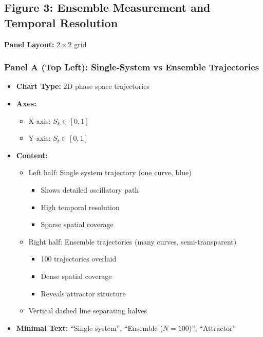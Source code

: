 
\subsection*{Figure 3: Ensemble Measurement and Temporal Resolution}

\textbf{Panel Layout:} $2 \times 2$ grid

\subsubsection*{Panel A (Top Left): Single-System vs Ensemble Trajectories}
\begin{itemize}
\item \textbf{Chart Type:} 2D phase space trajectories
\item \textbf{Axes:}
  \begin{itemize}
  \item X-axis: $S_k \in [0,1]$
  \item Y-axis: $S_t \in [0,1]$
  \end{itemize}
\item \textbf{Content:}
  \begin{itemize}
  \item Left half: Single system trajectory (one curve, blue)
    \begin{itemize}
    \item Shows detailed oscillatory path
    \item High temporal resolution
    \item Sparse spatial coverage
    \end{itemize}
  \item Right half: Ensemble trajectories (many curves, semi-transparent)
    \begin{itemize}
    \item 100 trajectories overlaid
    \item Dense spatial coverage
    \item Reveals attractor structure
    \end{itemize}
  \item Vertical dashed line separating halves
  \end{itemize}
\item \textbf{Minimal Text:} ``Single system'', ``Ensemble ($N=100$)'', ``Attractor''
\end{itemize}

